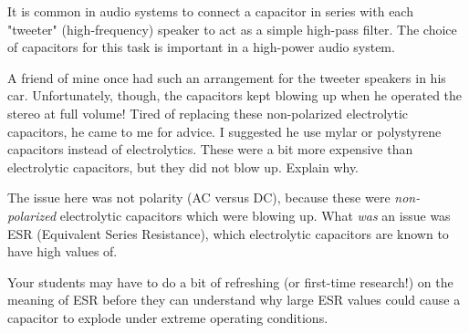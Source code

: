 

It is common in audio systems to connect a capacitor in series with each "tweeter" (high-frequency) speaker to act as a simple high-pass filter.  The choice of capacitors for this task is important in a high-power audio system.

A friend of mine once had such an arrangement for the tweeter speakers in his car.  Unfortunately, though, the capacitors kept blowing up when he operated the stereo at full volume!  Tired of replacing these non-polarized electrolytic capacitors, he came to me for advice.  I suggested he use mylar or polystyrene capacitors instead of electrolytics.  These were a bit more expensive than electrolytic capacitors, but they did not blow up.  Explain why.







The issue here was not polarity (AC versus DC), because these were {\it non-polarized} electrolytic capacitors which were blowing up.  What {\it was} an issue was ESR (Equivalent Series Resistance), which electrolytic capacitors are known to have high values of.







Your students may have to do a bit of refreshing (or first-time research!) on the meaning of ESR before they can understand why large ESR values could cause a capacitor to explode under extreme operating conditions.




